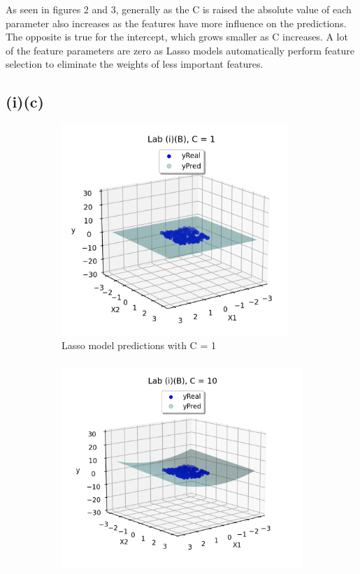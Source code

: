 \documentclass{article}
\begin{document}
As seen in figures 2 and 3, generally as the C is raised the absolute value of each parameter also increases as the features have more influence on the predictions. The opposite is true for the intercept, which grows smaller as C increases. A lot of the feature parameters are zero as Lasso models automatically perform feature selection to eliminate the weights of less important features.

\subsection{(i)(c)}
\begin{figure}
\centering
\begin{subfigure}{.5\linewidth}
  \centering
  \includegraphics[width=\linewidth, height=8cm]{ib1.png}
  \caption{Lasso model predictions with C = 1}
  \label{fig:sub1}
\end{subfigure}%
\begin{subfigure}{.5\textwidth}
  \centering
  \includegraphics[width=\linewidth, height=8cm]{ib2.png}

\end{subfigure}
\end{figure}
\end{document}

